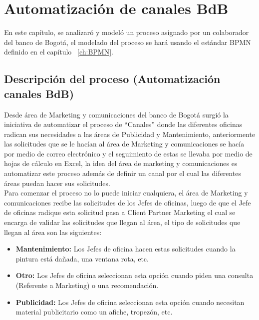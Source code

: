 \chapter{Automatización de canales BdB}
En este capítulo, se analizaró y modeló un proceso asignado por un colaborador del banco de Bogotá, el modelado del proceso se hará usando el estándar BPMN definido en el capítulo ~\ref{ch:BPMN}.


\section{Descripción del proceso (Automatización canales BdB)}
Desde área de Marketing y comunicaciones del banco de Bogotá surgió la iniciativa de automatizar el proceso de ``Canales'' donde las diferentes oficinas radican sus necesidades a las áreas de Publicidad y Mantenimiento, anteriormente las solicitudes que se le hacían al área de Marketing y comunicaciones se hacía por medio de correo electrónico y el seguimiento de estas se llevaba por medio de hojas de cálculo en Excel, la idea del área de marketing y comunicaciones es automatizar este proceso además de definir un canal por el cual las diferentes áreas puedan hacer sus solicitudes.\\

Para comenzar el proceso no lo puede iniciar cualquiera, el área de Marketing y comunicaciones recibe las solicitudes de los Jefes de oficinas, luego de que el Jefe de oficinas radique esta solicitud pasa a Client Partner Marketing el cual se encarga de validar las solicitudes que llegan al área, el tipo de solicitudes que llegan al área son las siguientes:\\
\begin{itemize}
	\item \textbf{Mantenimiento: } Los Jefes de oficina hacen estas solicitudes cuando  la pintura está dañada, una ventana rota, etc.
	\item \textbf{Otro: } Los Jefes de oficina seleccionan esta opción cuando piden una consulta (Referente a Marketing) o una recomendación.
	\item \textbf{Publicidad: }Los Jefes de oficina seleccionan esta opción cuando necesitan material publicitario como un afiche, tropezón, etc.
\end{itemize}

